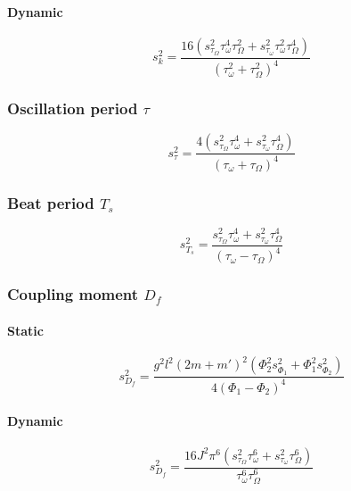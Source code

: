 \documentclass{scrreprt}
\begin{document}
\paragraph*{Dynamic}
\begin{equation}
s_k^2 = \frac{16 \left( s_{\tau_{\Omega}}^2 \tau_{\omega}^4 \tau_{\Omega}^2 + s_{\tau_{\omega}}^2 \tau_{\omega}^2 \tau_{\Omega}^4 \right)}{\left( \tau_{\omega}^2+ \tau_{\Omega}^2 \right)^4}
\end{equation}

\subsubsection{Oscillation period $\tau$}
\begin{equation}
s_{\tau}^2 = \frac{4 \left( s_{\tau_{\Omega}}^2 \tau_{\omega}^4 + s_{\tau_{\omega}}^2 \tau_{\Omega}^4 \right)}{\left( \tau_{\omega}+ \tau_{\Omega} \right)^4}
\end{equation}

\subsubsection{Beat period $T_s$}
\begin{equation}
s_{T_s}^2 = \frac{s_{\tau_{\Omega}}^2 \tau_{\omega}^4 + s_{\tau_{\omega}}^2 \tau_{\Omega}^4 }{\left( \tau_{\omega} - \tau_{\Omega} \right)^4}
\end{equation}

\subsubsection{Coupling moment $D_f$}

\paragraph*{Static}
\begin{equation}
s_{D_f}^2 = \frac{g^2 l^2 \left(2 m + m'\right)^2 \left( \Phi_2^2 s_{\Phi_1}^2 + \Phi_1^2 s_{\Phi_2}^2 \right)}{4 \left(\Phi_1 -\Phi_2\right)^4} 
\end{equation}

\paragraph*{Dynamic}
\begin{equation}
s_{D_f}^2 = \frac{16 J^2 \pi^6 \left( s_{\tau_{\Omega}}^2 \tau_{\omega}^6 + s_{\tau_{\omega}}^2 \tau_{\Omega}^6 \right)}{\tau_{\omega}^6 \tau_{\Omega}^6}
\end{equation}
\end{document}
